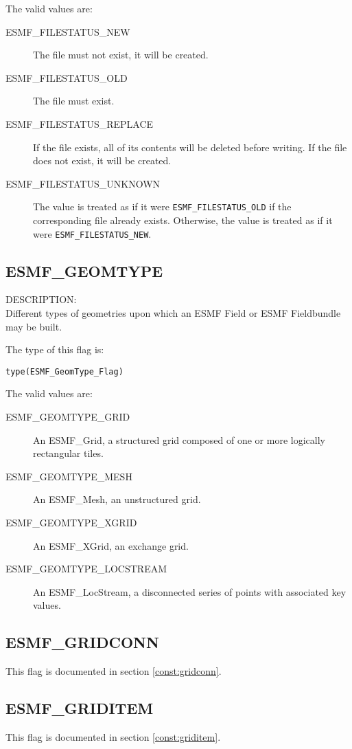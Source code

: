 The valid values are:
\begin{description}
\item [ESMF\_FILESTATUS\_NEW]
      The file must not exist, it will be created.
\item [ESMF\_FILESTATUS\_OLD]
      The file must exist.
\item [ESMF\_FILESTATUS\_REPLACE]
      If the file exists, all of its contents will be deleted before writing.
      If the file does not exist, it will be created.
\item [ESMF\_FILESTATUS\_UNKNOWN]
      The value is treated as if it were {\tt ESMF\_FILESTATUS\_OLD} if
      the corresponding file already exists. Otherwise, the value is
      treated as if it were {\tt ESMF\_FILESTATUS\_NEW}.

\end{description}

\subsection{ESMF\_GEOMTYPE}
\label{const:geomtype}

{\sf DESCRIPTION:\\}
 Different types of geometries upon which an ESMF Field or ESMF Fieldbundle may
be built. 

The type of this flag is:

{\tt type(ESMF\_GeomType\_Flag)}

The valid values are:
\begin{description}
\item [ESMF\_GEOMTYPE\_GRID]
      An ESMF\_Grid, a structured grid composed of one or more logically rectangular tiles.
\item [ESMF\_GEOMTYPE\_MESH]
      An ESMF\_Mesh, an unstructured grid.
\item [ESMF\_GEOMTYPE\_XGRID]
      An ESMF\_XGrid, an exchange grid.
\item [ESMF\_GEOMTYPE\_LOCSTREAM]
      An ESMF\_LocStream, a disconnected series of points with associated key values.
\end{description}

\subsection{ESMF\_GRIDCONN}
This flag is documented in section \ref{const:gridconn}.

\subsection{ESMF\_GRIDITEM}
This flag is documented in section \ref{const:griditem}.

